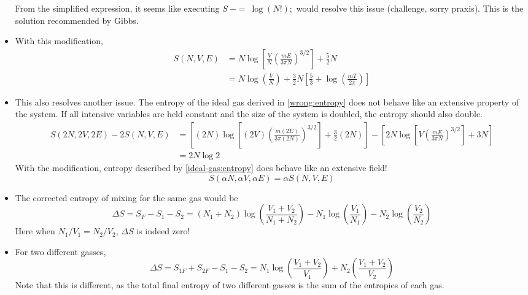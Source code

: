 \documentclass{article}
\begin{document}
\begin{itemize}
    From the simplified expression, it seems like executing $S\:-=\:\log(N!);$ would resolve this issue (challenge, sorry praxis). This is the solution recommended by Gibbs.
    \item With this modification,
    \begin{align}
        S(N,V,E)&=N\log\left[\frac{V}{N}\left(\frac{mE}{3\pi N}\right)^{3/2}\right]+\frac{5}{2}N\label{ideal-gas:entropy}\\ 
        &=N\log\left(\frac{V}{N}\right)+\frac{3}{2}N\left[\frac{5}{3}+\log(\frac{mT}{2\pi})\right]
    \end{align}
    \item This also resolves another issue. The entropy of the ideal gas derived in \eqref{wrong:entropy} does not behave like an extensive property of the system. If all intensive variables are held constant and the size of the system is doubled, the entropy should also double. 
    \begin{equation}
        \begin{aligned}
            S(2N,2V,2E)-2S(N,V,E)&=\left[(2N)\log\left[(2V)\left(\frac{m(2E)}{3\pi(2N)}\right)^{3/2}\right]+\frac{3}{2}(2N)\right]-\left[2N\log\left[V\left(\frac{mE}{3\pi N}\right)^{3/2}\right]+3N\right]
            \\&=2N\log 2
        \end{aligned}
    \end{equation}
    With the modification, entropy described by \eqref{ideal-gas:entropy} does behave like an extensive field!
    \begin{equation}
        S(\alpha N,\alpha V, \alpha E)=\alpha S(N,V,E)
    \end{equation}
    \item The corrected entropy of mixing for the same gas would be
    \begin{equation}
        \Delta S=S_F-S_1-S_2=(N_1+N_2)\log\left(\frac{V_1+V_2}{N_1+N_2}\right)-N_1\log\left(\frac{V_1}{N_1}\right)-N_2\log\left(\frac{V_2}{N_2}\right)\label{mixing:same}
    \end{equation}
    Here when $N_1/V_1=N_2/V_2$, $\Delta S$ is indeed zero!
    \item For two different gasses,
    \begin{equation}
        \Delta S=S_{1F}+S_{2F}-S_1-S_2=N_1\log\left(\frac{V_1+V_2}{V_1}\right)+N_2\left(\frac{V_1+V_2}{V_2}\right)\label{mixing:different}
    \end{equation}
    Note that this is different, as the total final entropy of two different gasses is the sum of the entropies of each gas.
\end{itemize}
\end{document}

